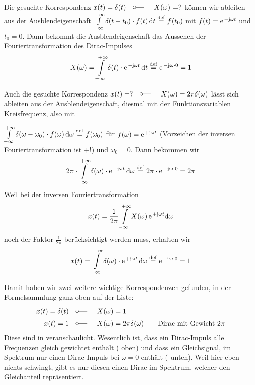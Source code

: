 \cleardoublepage
\begin{Ansatz}
Die gesuchte Korrespondenz $x(t)=\delta(t)\quad \fourier \quad X(\omega)=?$
können wir ableiten aus der Ausblendeigenschaft
$\int\limits_{-\infty}^{+\infty} \delta(t-t_0) \cdot f(t) \, \mathrm{d} t \stackrel{\mathrm{def}}= f(t_0)$
mit $f(t) = \e^{-\im \omega t}$ und $t_0=0$.
%
Dann bekommt die Ausblendeigenschaft das Aussehen der Fouriertransformation
des Dirac-Impulses
\begin{equation}
X(\omega) = \int\limits_{-\infty}^{+\infty} \delta(t) \cdot \e^{-\im \omega t} \, \fsd t \stackrel{\mathrm{def}}= \e^{-\im \omega \cdot 0} = 1
\end{equation}

Auch die gesuchte Korrespondenz
$x(t)= ? \quad \fourier \quad X(\omega)=2\pi \delta(\omega)$ lässt sich
ableiten aus der Ausblendeigenschaft, diesmal mit der Funktionsvariablen Kreisfrequenz, also mit

$\int\limits_{-\infty}^{+\infty} \delta(\omega-\omega_0) \cdot f(\omega) \, \mathrm{d} \omega \stackrel{\mathrm{def}}= f(\omega_0)$
für $f(\omega) = \e^{+\im \omega t}$ (Vorzeichen der inversen Fouriertransformation ist $+$!) und $\omega_0=0$.
%
Dann bekommen wir
\begin{equation}
2\pi \cdot \int\limits_{-\infty}^{+\infty} \delta(\omega) \cdot \e^{+\im \omega t} \, \fsd \omega \stackrel{\mathrm{def}}= 2\pi \cdot \e^{+\im \omega \cdot 0} = 2\pi
\end{equation}
%
Weil bei der inversen Fouriertransformation
\begin{align}
x(t) = \frac{1}{2\pi} \int\limits_{-\infty}^{+\infty} X(\omega) \, \e^{+\im \omega t} \fsd \omega
\end{align}
noch der Faktor $\frac{1}{2\pi}$ berücksichtigt werden muss, erhalten wir
\begin{equation}
x(t) = \int\limits_{-\infty}^{+\infty} \delta(\omega) \cdot \e^{+\im \omega t} \, \fsd \omega \stackrel{\mathrm{def}}= \e^{+\im \omega \cdot 0} = 1
\end{equation}

\end{Ansatz}
\begin{Loesung}
Damit haben wir zwei weitere wichtige Korrespondenzen gefunden, in der Formelsammlung
ganz oben auf der Liste:
\begin{align}
\label{eq:D410BDAAE0_Loesung1}
x(t)= \delta(t) &\quad \fourier \quad X(\omega)=1\\
\label{eq:D410BDAAE0_Loesung2}
x(t)= 1 &\quad \fourier \quad X(\omega)=2\pi \delta(\omega)\qquad \text{Dirac mit Gewicht}\,\,2\pi
\end{align}
%
Diese sind in  veranschaulicht.
%
Wesentlich ist, dass ein Dirac-Impuls alle Frequenzen gleich gewichtet enthält
( oben)
und dass ein Gleichsignal, im Spektrum nur einen Dirac-Impuls bei $\omega=0$ enthält
( unten).
Weil hier eben nichts schwingt, gibt es nur diesen einen Dirac im Spektrum, welcher den
Gleichanteil repräsentiert.
\end{Loesung}
